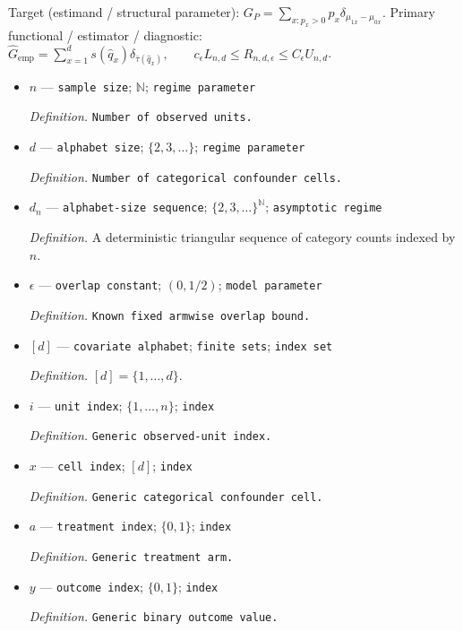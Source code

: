 \documentclass{article}
\begin{document}
Target (estimand / structural parameter): \(G_P=\sum_{x:p_x>0}p_x\delta_{\mu_{1x}-\mu_{0x}}\).
Primary functional / estimator / diagnostic: \(\widehat G_{\mathrm{emp}}=\sum_{x=1}^ds(\widehat q_x)\delta_{\bar\tau(\widehat q_x)},\qquad c_\epsilon L_{n,d}\le R_{n,d,\epsilon}\le C_\epsilon U_{n,d}\).
\begin{itemize}
  \item \(n\) --- \texttt{sample size}; \(\mathbb N\); \texttt{regime parameter}
  \par\smallskip\noindent\emph{Definition.} \texttt{Number of observed units.}
  \item \(d\) --- \texttt{alphabet size}; \(\{2,3,\ldots\}\); \texttt{regime parameter}
  \par\smallskip\noindent\emph{Definition.} \texttt{Number of categorical confounder cells.}
  \item \(d_n\) --- \texttt{alphabet-\allowbreak{}size sequence}; \(\{2,3,\ldots\}^{\mathbb N}\); \texttt{asymptotic regime}
  \par\smallskip\noindent\emph{Definition.} A deterministic triangular sequence of category counts indexed by \(n\).
  \item \(\epsilon\) --- \texttt{overlap constant}; \((0,1/2)\); \texttt{model parameter}
  \par\smallskip\noindent\emph{Definition.} \texttt{Known fixed armwise overlap bound.}
  \item \([d]\) --- \texttt{covariate alphabet}; \texttt{finite sets}; \texttt{index set}
  \par\smallskip\noindent\emph{Definition.} \([d]=\{1,\ldots,d\}\).
  \item \(i\) --- \texttt{unit index}; \(\{1,\ldots,n\}\); \texttt{index}
  \par\smallskip\noindent\emph{Definition.} \texttt{Generic observed-\allowbreak{}unit index.}
  \item \(x\) --- \texttt{cell index}; \([d]\); \texttt{index}
  \par\smallskip\noindent\emph{Definition.} \texttt{Generic categorical confounder cell.}
  \item \(a\) --- \texttt{treatment index}; \(\{0,1\}\); \texttt{index}
  \par\smallskip\noindent\emph{Definition.} \texttt{Generic treatment arm.}
  \item \(y\) --- \texttt{outcome index}; \(\{0,1\}\); \texttt{index}
  \par\smallskip\noindent\emph{Definition.} \texttt{Generic binary outcome value.}

\end{itemize}
\end{document}
